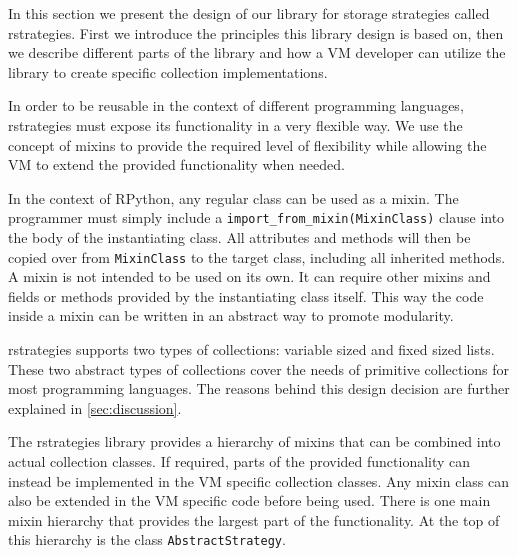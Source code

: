 \documentclass[english,10pt]{sigplanconf}
\begin{document}




In this section we present the design of our library for storage
strategies called rstrategies.  First we introduce the principles this
library design is based on, then we describe different parts of the
library and how a VM developer can utilize the library to create
specific collection implementations.

In order to be reusable in the context of different programming
languages, rstrategies must expose its functionality in a very
flexible way.  We use the concept of mixins \cite{brachaMixins,
  mixins} to provide the required level of flexibility while allowing
the VM to extend the provided functionality when needed.

\begin{sloppypar}
In the context of RPython, any regular class can be used as a mixin.
The programmer must simply include a
\lstinline!import_from_mixin(MixinClass)! clause into the body of the
instantiating class.  All attributes and methods will then be copied
over from \lstinline{MixinClass} to the target class, including all
inherited methods.  A mixin is not intended to be used on its own.  It
can require other mixins and fields or methods provided by the
instantiating class itself.  This way the code inside a mixin can be
written in an abstract way to promote modularity.
\end{sloppypar}

rstrategies supports two types of collections: variable sized and
fixed sized lists.  These two abstract types of collections cover the
needs of primitive collections for most programming languages.  The
reasons behind this design decision are further explained in \autoref{sec:discussion}.

The rstrategies library provides a hierarchy of mixins that can be
combined into actual collection classes.  If required, parts of the
provided functionality can instead be implemented in the VM specific
collection classes.  Any mixin class can also be extended in the VM
specific code before being used.  There is one main mixin hierarchy
that provides the largest part of the functionality.  At the top of
this hierarchy is the class \lstinline{AbstractStrategy}.
\end{document}
